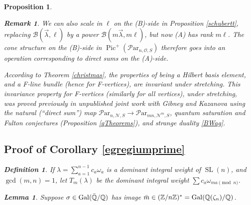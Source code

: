 \documentclass[11pt]{amsart}
\newcommand\op{\operatorname}
\newcommand\Pic{\operatorname{Pic}}
\newcommand\Par{\mathcal{P}\text{ar} }
\newtheorem{remark}[theorem]{ Remark}
\newtheorem{proposition}[theorem]{Proposition}
\newtheorem{lemma}[theorem]{Lemma}
\newtheorem{defi}[theorem]{Definition}
\numberwithin{theorem}{subsection}
\begin{document}
{\begin{proposition}
\begin{remark}
We can also scale in $\ell$ on the (B)-side in Proposition \ref{schubertt}, replacing $\mathcal{B}(\vec{\lambda},\ell)$ by a power $\mathcal{B}(m\vec{\lambda},m\ell)$, but now (A) has rank
$m\ell$. The cone structure on the (B)-side in $\Pic^+(\Par_{n,\mathcal{O},S})$ therefore goes into an operation corresponding to direct sums on the (A)-side.

According to Theorem \ref{christmas}, the properties of being a Hilbert basis element, and a F-line bundle (hence for F-vertices), are invariant under stretching. This invariance property for F-vertices (similarly for all vertices), under stretching,  was proved previously in unpublished joint work with  Gibney and Kazanova using the natural (``direct sum'') map $\Par_{n,\mathcal{N},S}\to \Par_{mn,\mathcal{N}^m,S}$, quantum saturation and Fulton conjectures (Proposition   \ref{qTheorems}), and strange duality \ref{BWag}.
\end{remark}

\subsection{Proof of Corollary \ref{egregiumprime}}
\begin{defi}\label{aliB}
If $\lambda=\sum_{a=1}^{n-1} c_a\omega_a$ is a dominant integral weight of $\op{SL}(n)$, and $\op{gcd}(m,n)=1$, let $T_m(\lambda)$ be the dominant integral weight $\sum c_a\omega_{ma \pmod{n}}$.
\end{defi}

\begin{lemma}\label{calcul}
Suppose $\sigma\in \op{Gal}(\bar{\Bbb{Q}}/\Bbb{Q})$ has image $\bar{m}\in (\Bbb{Z}/n\Bbb{Z})^*=\op{Gal}(\Bbb{Q}(\zeta_n)/\Bbb{Q})$.


\end{lemma}
\end{proposition}}
\end{document}

